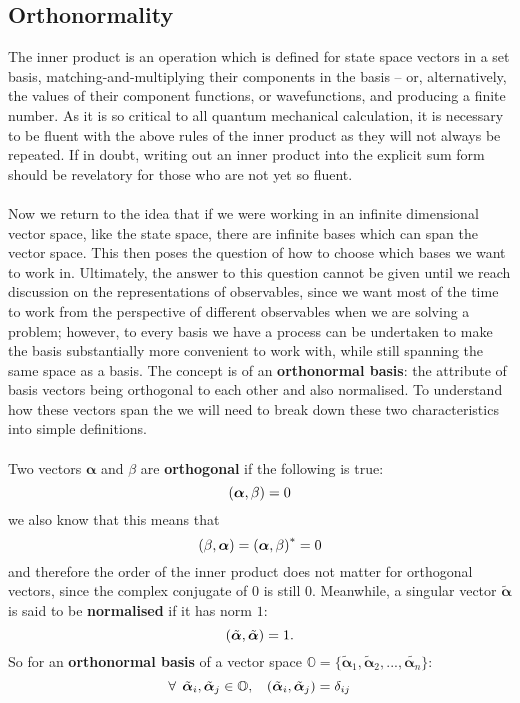 \subsection{Orthonormality}
The inner product is an operation which is defined for state space vectors in a set basis, matching-and-multiplying their components in the basis -- or, alternatively, the values of their component functions, or wavefunctions, and producing a finite number. As it is so critical to all quantum mechanical calculation, it is necessary to be fluent with the above rules of the inner product as they will not always be repeated. If in doubt, writing out an inner product into the explicit sum form should be revelatory for those who are not yet so fluent.
\\\\
Now we return to the idea that if we were working in an infinite dimensional vector space, like the state space, there are infinite bases which can span the vector space. This then poses the question of how to choose which bases we want to work in. Ultimately, the answer to this question cannot be given until we reach discussion on the representations of observables, since we want most of the time to work from the perspective of different observables when we are solving a problem; however, to every basis we have a process can be undertaken to make the basis substantially more convenient to work with, while still spanning the same space as a basis. The concept is of an \textbf{orthonormal basis}: the attribute of basis vectors being orthogonal to each other and also normalised. To understand how these vectors span the  we will need to break down these two characteristics into simple definitions.
\\\\
Two  vectors $\bm{\alpha}$ and $\beta$ are \textbf{orthogonal} if the following is true:
$$
\left(\bm{\alpha},\beta\right) =  0
$$
we also know that this means that
$$
\left(\beta,\bm{\alpha}\right) = \left(\bm{\alpha},\beta\right)^{\ast} = 0
$$
and therefore the order of the inner product does not matter for orthogonal vectors, since the complex conjugate of $0$ is still $0$. Meanwhile, a singular vector $\tilde{\bm{\alpha}}$ is said to be \textbf{normalised} if it has norm $1$:
$$
\left(\tilde{\bm{\alpha}},\tilde{\bm{\alpha}}\right) = 1.
$$
So for an \textbf{orthonormal basis} of a vector space $\mathbb{O}=\{\tilde{\bm{\alpha}}_{1},\tilde{\bm{\alpha}}_{2},...,\tilde{\bm{\alpha}_{n}}\}$:
$$
\forall\:\: \tilde{\bm{\alpha}}_{i},\tilde{\bm{\alpha}}_{j} \in \mathbb{O}, \:\:\:\:
\left(\tilde{\bm{\alpha}}_{i},\tilde{\bm{\alpha}}_{j}\right)= \delta_{ij}
$$
